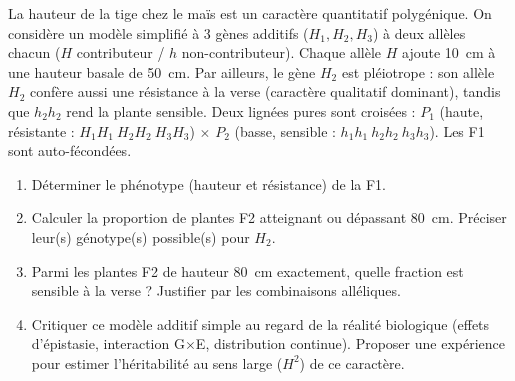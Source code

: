 \documentclass[11pt]{article}
\begin{document}
\begin{exercice}
La hauteur de la tige chez le maïs est un caractère quantitatif polygénique. On considère un modèle simplifié à 3 gènes additifs ($H_1, H_2, H_3$) à deux allèles chacun ($H$ contributeur / $h$ non-contributeur). Chaque allèle $H$ ajoute \SI{10}{cm} à une hauteur basale de \SI{50}{cm}.
Par ailleurs, le gène $H_2$ est pléiotrope : son allèle $H_2$ confère aussi une résistance à la verse (caractère qualitatif dominant), tandis que $h_2h_2$ rend la plante sensible.
Deux lignées pures sont croisées : $P_1$ (haute, résistante : $H_1H_1\ H_2H_2\ H_3H_3$) $\times$ $P_2$ (basse, sensible : $h_1h_1\ h_2h_2\ h_3h_3$). Les F1 sont auto-fécondées.
\begin{enumerate}
\item Déterminer le phénotype (hauteur et résistance) de la F1.
\item Calculer la proportion de plantes F2 atteignant ou dépassant \SI{80}{cm}. Préciser leur(s) génotype(s) possible(s) pour $H_2$.
\item Parmi les plantes F2 de hauteur \SI{80}{cm} exactement, quelle fraction est sensible à la verse ? Justifier par les combinaisons alléliques.
\item Critiquer ce modèle additif simple au regard de la réalité biologique (effets d'épistasie, interaction G$\times$E, distribution continue). Proposer une expérience pour estimer l'héritabilité au sens large ($H^2$) de ce caractère.
\end{enumerate}
\end{exercice}
\end{document}
